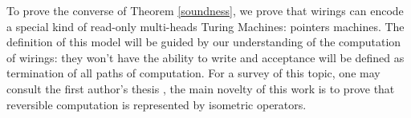 To prove the converse of Theorem \ref{soundness}, we prove that wirings can encode a special kind of read-only multi-heads Turing Machines: pointers machines.
The definition of this model will be guided by our understanding of the computation of wirings: they won't have the ability to write and acceptance will be defined as termination of all paths of computation.
For a survey of this topic, one may consult the first author's thesis \cite[Chap.4]{Aubert2013b}, the main novelty of this work is to prove that reversible computation is represented by isometric operators.




